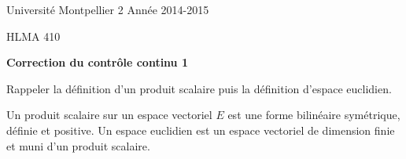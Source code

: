\documentclass[a4paper]{article}
\begin{document}
\noindent Université Montpellier 2 \hfill Année 2014-2015

\noindent HLMA 410
 


\bigskip

\begin{center}
{\large \sffamily\bfseries Correction du contrôle continu 1}
\end{center}


\bigskip
\bigskip


 Rappeler la définition d'un produit scalaire puis la définition d'espace euclidien.
\bigskip

Un produit scalaire sur un espace vectoriel $E$  est une forme bilinéaire symétrique, définie et positive. Un espace euclidien est un espace vectoriel de dimension finie et muni d'un produit scalaire.
\bigskip
\end{document}
